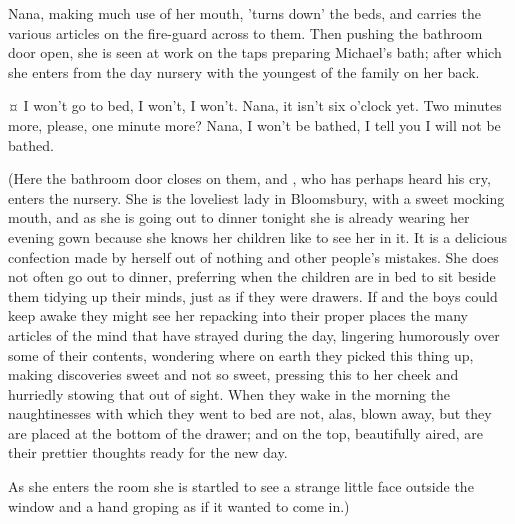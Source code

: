 \begin{stagedir}
Nana, making much use of her mouth, 'turns down' the beds,
and carries the various articles on the fire-guard across to them.
Then pushing the bathroom door open,
she is seen at work on the taps preparing Michael's bath;
after which she enters from the day nursery with the youngest of the family on her back.
\end{stagedir}

\begin{drama}

\michaelspeaks {}¤
I won't go to bed, I won't, I won't.
Nana, it isn't six o'clock yet.
Two minutes more, please, one minute more?
Nana, I won't be bathed, I tell you I will not be bathed.

\end{drama}

\begin{stagedir}
(Here the bathroom door closes on them, and \mrsdarling, who has perhaps heard his cry, enters the nursery.
She is the loveliest lady in Bloomsbury, with a sweet mocking mouth,
and as she is going out to dinner tonight she is already wearing her evening gown
because she knows her children like to see her in it.
It is a delicious confection made by herself out of nothing and other people's mistakes.
She does not often go out to dinner,
preferring when the children are in bed to sit beside them tidying up their minds, just as if they were drawers.
If \wendy and the boys could keep awake
they might see her repacking into their proper places the many articles of the mind that have strayed during the day,
lingering humorously over some of their contents,
wondering where on earth they picked this thing up, making discoveries sweet and not so sweet,
pressing this to her cheek and hurriedly stowing that out of sight.
When they wake in the morning the naughtinesses with which they went to bed are not, alas, blown away,
but they are placed at the bottom of the drawer;
and on the top, beautifully aired, are their prettier thoughts ready for the new day.

As she enters the room she is startled to see a strange little face outside the window
and a hand groping as if it wanted to come in.)
\end{stagedir}

